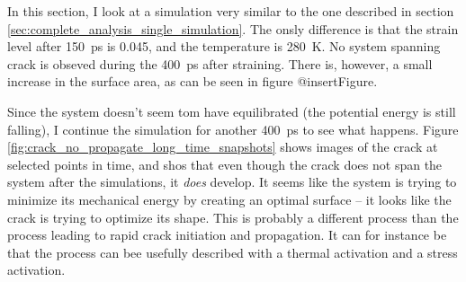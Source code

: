 In this section, I look at a simulation very similar to the one described in section \ref{sec:complete_analysis_single_simulation}. The onsly difference is that the strain level after \SI{150}{\pico\second} is 0.045, and the temperature is \SI{280}{\kelvin}. No system spanning crack is obseved during the \SI{400}{\pico\second} after straining. There is, however, a small increase in the surface area, as can be seen in figure @insertFigure. 

Since the system doesn't seem tom have equilibrated (the potential energy is still falling), I continue the simulation for another \SI{400}{\pico\second} to see what happens. Figure \ref{fig:crack_no_propagate_long_time_snapshots} shows images of the crack at selected points in time, and shos that even though the crack does not span the system after the simulations, it \emph{does} develop. It seems like the system is trying to minimize its mechanical energy by creating an optimal surface -- it looks like the crack is trying to optimize its shape. This is probably a different process than the process leading to rapid crack initiation and propagation. It can for instance be that the process can bee usefully described with a thermal activation and a stress activation. 

